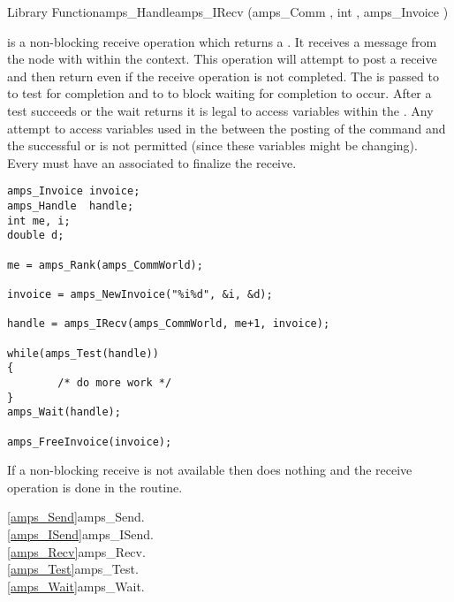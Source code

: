 \begin{deftypefn}{Library Function}{amps_Handle}{amps\_IRecv}
(amps_Comm , int , amps_Invoice )

\DESCRIPTION

 is a non-blocking receive operation which returns a
.  It receives a message from the node with 
within the  context.  This operation will attempt to post a
receive and then return even if the receive operation is not completed.
The  is passed to  to test for completion
and to  to block waiting for completion to occur.
After a test succeeds or the wait returns it is legal to access
variables within the .  Any attempt to access variables
used in the  between the posting of the 
command and the successful  or  is not
permitted (since these variables might be changing).  Every 
must have an associated  to finalize the receive.


\EXAMPLE

\begin{display}\begin{verbatim}
amps_Invoice invoice;
amps_Handle  handle;
int me, i;
double d;

me = amps_Rank(amps_CommWorld);

invoice = amps_NewInvoice("%i%d", &i, &d);

handle = amps_IRecv(amps_CommWorld, me+1, invoice);

while(amps_Test(handle))
{
        /* do more work */
}
amps_Wait(handle);

amps_FreeInvoice(invoice);
\end{verbatim}\end{display}

\NOTES

If a non-blocking receive is not available then  does
nothing and the receive operation is done in the 
routine.

\SEEALSO
\vref{amps_Send}{amps\_Send}. \\
\vref{amps_ISend}{amps\_ISend}. \\
\vref{amps_Recv}{amps\_Recv}. \\
\vref{amps_Test}{amps\_Test}. \\
\vref{amps_Wait}{amps\_Wait}. \\

\end{deftypefn}

